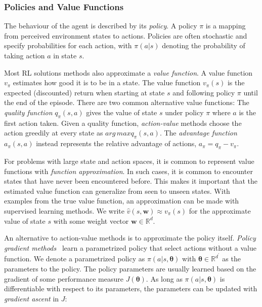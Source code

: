 \subsubsection{Policies and Value Functions}
\label{sec:policy-value}

The behaviour of the agent is described by its \textit{policy}.
A policy \(\pi\) is a mapping from perceived environment states to actions.
Policies are often stochastic and specify probabilities for each action, with \(\pi(a|s)\) denoting the probability of taking action \(a\) in state \(s\).~\cite{sutton_reinforcement_2018}

Most RL solutions methods also approximate a \textit{value function}.
A value function \(v_\pi\) estimates how good it is to be in a state.
The value function \(v_\pi(s)\) is the expected (discounted) return when starting at state \(s\) and following policy \(\pi\) until the end of the episode.
There are two common alternative value functions:
The \textit{quality function} \(q_\pi(s,a)\) gives the value of state \(s\) under policy \(\pi\) where \(a\) is the first action taken.
Given a quality function, \textit{action-value} methods choose the action greedily at every state as \(arg\,max q_\pi(s, a)\).
The \textit{advantage function} \(a_\pi(s, a)\) instead represents the relative advantage of actions, \(a_\pi = q_\pi - v_\pi\).~\cite{sutton_reinforcement_2018}

For problems with large state and action spaces, it is common to represent value functions with \textit{function approximation}.
In such cases, it is common to encounter states that have never been encountered before.
This makes it important that the estimated value function can generalize from seen to unseen states.
With examples from the true value function, an approximation can be made with supervised learning methods.
We write \(\hat{v}(s,\mathbf{w}) \approx v_\pi(s)\) for the approximate value of state \(s\) with some weight vector \(\mathbf{w} \in \mathbb{R}^d\).~\cite{sutton_reinforcement_2018}

An alternative to action-value methods is to approximate the policy itself.
\textit{Policy gradient methods}~\cite{sutton_policygrad_1999} learn a parametrized policy that select actions without a value function.
We denote a parametrized policy as \(\pi(a|s,\boldsymbol{\theta})\) with \(\boldsymbol{\theta} \in \mathbb{R}^{d^\prime}\) as the parameters to the policy.
The policy parameters are usually learned based on the gradient of some performance measure \(J(\boldsymbol{\theta})\).
As long as \(\pi(a|s,\boldsymbol{\theta})\) is differentiable with respect to its parameters, the parameters can be updated with \textit{gradient ascent} in \(J\):


